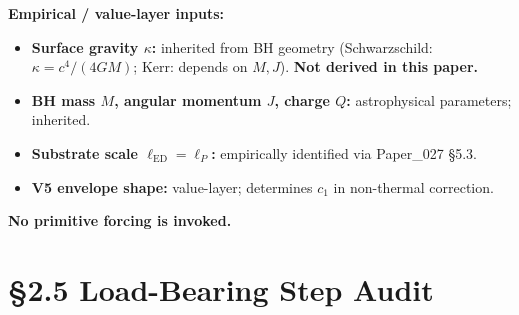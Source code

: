 \documentclass[11pt,a4paper]{article}
\begin{document}
\textbf{Empirical / value-layer inputs:}

\begin{itemize}[noitemsep]
\item \textbf{Surface gravity $\kappa$:} inherited from BH geometry (Schwarzschild: $\kappa = c^4/(4GM)$; Kerr: depends on $M, J$). \textbf{Not derived in this paper.}
\item \textbf{BH mass $M$, angular momentum $J$, charge $Q$:} astrophysical parameters; inherited.
\item \textbf{Substrate scale $\ell_\mathrm{ED} = \ell_P$:} empirically identified via Paper\_027 \S5.3.
\item \textbf{V5 envelope shape:} value-layer; determines $c_1$ in non-thermal correction.
\end{itemize}

\textbf{No primitive forcing is invoked.}

\section*{\S2.5 Load-Bearing Step Audit}
\end{document}
